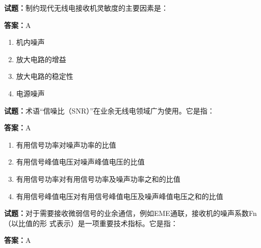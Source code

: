 \documentclass{ctexbook}
\begin{document}




\vspace{1em}

\textbf{试题：}制约现代无线电接收机灵敏度的主要因素是： 

\textbf{答案：}A 

\begin{enumerate}[leftmargin=3em]
  \item 机内噪声 

  \item 放大电路的增益 

  \item 放大电路的稳定性 

  \item 电源噪声 

\end{enumerate}






\vspace{1em}

\textbf{试题：}术语“信噪比（SNR）”在业余无线电领域广为使用。它是指： 

\textbf{答案：}A 

\begin{enumerate}[leftmargin=3em]
  \item 有用信号功率对噪声功率的比值 

  \item 有用信号峰值电压对噪声峰值电压的比值 

  \item 有用信号功率对有用信号功率及噪声功率之和的比值 

  \item 有用信号峰值电压对有用信号峰值电压及噪声峰值电压之和的比值 

\end{enumerate}





\vspace{1em}

\textbf{试题：}对于需要接收微弱信号的业余通信，例如EME通联，接收机的噪声系数Fn（以比值的形
式表示）是一项重要技术指标。它是指： 

\textbf{答案：}A 
\end{document}
